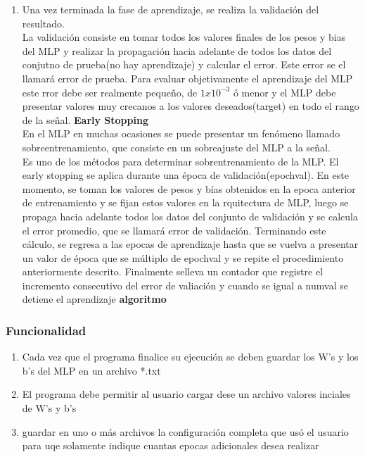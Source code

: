 \documentclass{article}
\begin{document}
\begin{enumerate}
	\item Una vez terminada la fase de aprendizaje, se realiza la validación del resultado.\\
	La validación consiste en tomar todos los valores finales de los pesos y bias del MLP y realizar la propagación hacia adelante de todos los datos del conjutno de prueba(no hay aprendizaje) y calcular el error. Este error se el llamará error de prueba.
	Para evaluar objetivamente el aprendizaje del MLP este rror debe ser realmente pequeño, de $1x10^{-3}$ ó menor y el MLP debe presentar valores muy crecanos a los valores deseados(target) en todo el rango de la señal.
	\textbf{Early Stopping}\\
	En el MLP en muchas ocasiones se puede presentar un fenómeno llamado sobreentrenamiento, que consiste en un sobreajuste del MLP a la señal.\\
	Es uno de los métodos para determinar sobrentrenamiento de la MLP. El early stopping se aplica durante una época de validación(epochval).
	En este momento, se toman los valores de pesos y bías obtenidos en la epoca anterior de entrenamiento y se fijan estos valores en la rquitectura de MLP, luego se propaga hacia adelante todos los datos del conjunto de validación y se calcula el error promedio, que se llamará error de validación. Terminando este cálculo, se regresa a las epocas de aprendizaje hasta que se vuelva a presentar un valor de época que se múltiplo de epochval y se repite el procedimiento anteriormente descrito. Finalmente selleva un contador que registre el incremento consecutivo del error de valiación y cuando se igual a numval se detiene el aprendizaje
	\textbf{algoritmo}\\
\end{enumerate}
\subsubsection{Funcionalidad}
\begin{enumerate}
	\item Cada vez que el programa finalice su ejecución se deben guardar los W's y los b's del MLP en un archivo *.txt
	\item El programa debe permitir al usuario cargar dese un archivo valores inciales de W's y b's
	\item guardar en uno o más archivos la configuración completa que usó el usuario para uqe solamente indique cuantas epocas adicionales desea realizar
\end{enumerate}
\end{document}
